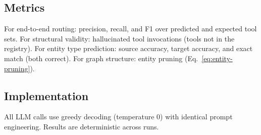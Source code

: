 \subsection{Metrics}
\label{sec:metrics}

For end-to-end routing: precision, recall, and F1 over predicted and expected tool sets.
For structural validity: hallucinated tool invocations (tools not in the registry).
For entity type prediction: source accuracy, target accuracy, and exact match (both correct).
For graph structure: entity pruning (Eq.~\ref{eq:entity-pruning}).

\subsection{Implementation}
\label{sec:implementation}

All LLM calls use greedy decoding (temperature 0) with identical prompt engineering. Results are deterministic across runs.
